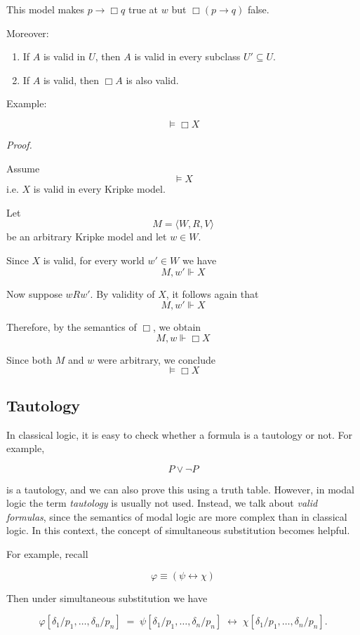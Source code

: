 \documentclass[12pt,a4paper,openany]{article}
\begin{document}
This model makes $p \to \Box q$ true at $w$ but $\Box(p \to q)$ false.

Moreover:

\begin{enumerate}
    \item If $A$ is valid in $U$, then $A$ is valid in every subclass $U' \subseteq U$.
    \item If $A$ is valid, then $\Box A$ is also valid.
\end{enumerate}

Example:

$$\models \Box X$$

\textit{Proof.}

Assume
$$\models X$$
i.e. $X$ is valid in every Kripke model.

Let
$$M = \langle W, R, V \rangle$$
be an arbitrary Kripke model and let $w \in W$.

Since $X$ is valid, for every world $w' \in W$ we have
$$M, w' \Vdash X$$

Now suppose $w R w'$. By validity of $X$, it follows again that
$$M, w' \Vdash X$$

Therefore, by the semantics of $\Box$, we obtain
$$M, w \Vdash \Box X$$

Since both $M$ and $w$ were arbitrary, we conclude
$$\models \Box X$$

\subsection{Tautology}

In classical logic, it is easy to check whether a formula is a tautology or not. For example,

$$P \lor \neg P$$

is a tautology, and we can also prove this using a truth table. However, in modal logic the term \textit{tautology} is usually not used. Instead, we talk about \textit{valid formulas}, since the semantics of modal logic are more complex than in classical logic. In this context, the concept of simultaneous substitution becomes helpful.

For example, recall

$$\varphi \equiv (\psi \leftrightarrow \chi)$$

Then under simultaneous substitution we have

$$\varphi[\delta_1/p_1, \ldots, \delta_n/p_n] \;=\; 
\psi[\delta_1/p_1, \ldots, \delta_n/p_n] \;\leftrightarrow\; 
\chi[\delta_1/p_1, \ldots, \delta_n/p_n].$$
\end{document}
